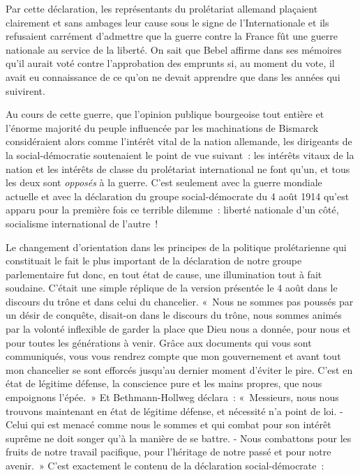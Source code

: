 \documentclass[french,twoside]{book} %
\begin{document}
\noindent Par cette déclaration, les représentants du prolétariat allemand plaçaient clairement et sans ambages leur cause sous le signe de l’Internationale et ils refusaient carrément d’admettre que la guerre contre la France fût une guerre nationale au service de la liberté. On sait que Bebel affirme dans ses mémoires qu’il aurait voté contre l’approbation des emprunts si, au moment du vote, il avait eu connaissance de ce qu’on ne devait apprendre que dans les années qui suivirent.\par
Au cours de cette guerre, que l’opinion publique bourgeoise tout entière et l’énorme majorité du peuple influencée par les machinations de Bismarck considéraient alors comme l’intérêt vital de la nation allemande, les dirigeants de la social-démocratie soutenaient le point de vue suivant : les intérêts vitaux de la nation et les intérêts de classe du prolétariat international ne font qu’un, et tous les deux sont \emph{opposés} à la guerre. C'est seulement avec la guerre mondiale actuelle et avec la déclaration du groupe social-démocrate du 4 août 1914 qu’est apparu pour la première fois ce terrible dilemme : liberté nationale d’un côté, socialisme international de l’autre !\par
Le changement d’orientation dans les principes de la politique prolétarienne qui constituait le fait le plus important de la déclaration de notre groupe parlementaire fut donc, en tout état de cause, une illumination tout à fait soudaine. C'était une simple réplique de la version présentée le 4 août dans le discours du trône et dans celui du chancelier. « Nous ne sommes pas poussés par un désir de conquête, disait-on dans le discours du trône, nous sommes animés par la volonté inflexible de garder la place que Dieu nous a donnée, pour nous et pour toutes les générations à venir. Grâce aux documents qui vous sont communiqués, vous vous rendrez compte que mon gouvernement et avant tout mon chancelier se sont efforcés jusqu’au dernier moment d’éviter le pire. C'est en état de légitime défense, la conscience pure et les mains propres, que nous empoignons l’épée. » Et Bethmann-Hollweg déclara : « Messieurs, nous nous trouvons maintenant en état de légitime défense, et nécessité n’a point de loi. - Celui qui est menacé comme nous le sommes et qui combat pour son intérêt suprême ne doit songer qu’à la manière de se battre. - Nous combattons pour les fruits de notre travail pacifique, pour l’héritage de notre passé et pour notre avenir. » C'est exactement le contenu de la déclaration social-démocrate :\par
\end{document}
